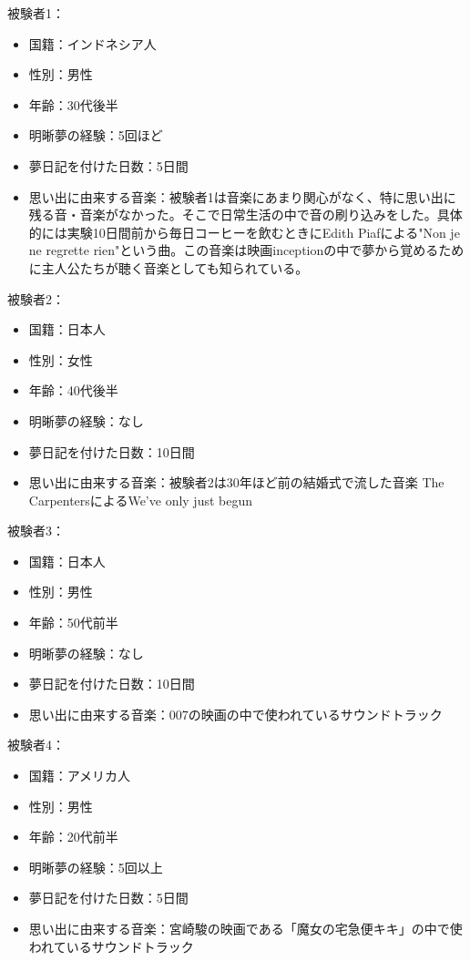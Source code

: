 被験者1：
\begin{itemize}
\item 国籍：インドネシア人
\item 性別：男性
\item 年齢：30代後半
\item 明晰夢の経験：5回ほど
\item 夢日記を付けた日数：5日間
\item 思い出に由来する音楽：被験者1は音楽にあまり関心がなく、特に思い出に残る音・音楽がなかった。そこで日常生活の中で音の刷り込みをした。具体的には実験10日間前から毎日コーヒーを飲むときにEdith Piafによる"Non je ne regrette rien"という曲。この音楽は映画inceptionの中で夢から覚めるために主人公たちが聴く音楽としても知られている。
\end{itemize}

被験者2：
\begin{itemize}
\item 国籍：日本人
\item 性別：女性
\item 年齢：40代後半
\item 明晰夢の経験：なし
\item 夢日記を付けた日数：10日間
\item 思い出に由来する音楽：被験者2は30年ほど前の結婚式で流した音楽 The CarpentersによるWe've only just begun
\end{itemize}

被験者3：
\begin{itemize}
\item 国籍：日本人
\item 性別：男性
\item 年齢：50代前半
\item 明晰夢の経験：なし
\item 夢日記を付けた日数：10日間
\item 思い出に由来する音楽：007の映画の中で使われているサウンドトラック
\end{itemize}

被験者4：
\begin{itemize}
\item 国籍：アメリカ人
\item 性別：男性
\item 年齢：20代前半
\item 明晰夢の経験：5回以上
\item 夢日記を付けた日数：5日間
\item 思い出に由来する音楽：宮崎駿の映画である「魔女の宅急便キキ」の中で使われているサウンドトラック
\end{itemize}

